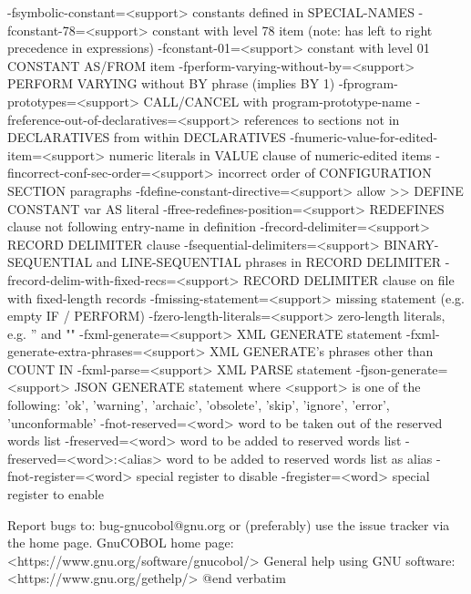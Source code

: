   -fsymbolic-constant=<support>	constants defined in SPECIAL-NAMES
  -fconstant-78=<support>	constant with level 78 item (note: has left to right precedence in expressions)
  -fconstant-01=<support>	constant with level 01 CONSTANT AS/FROM item
  -fperform-varying-without-by=<support>	PERFORM VARYING without BY phrase (implies BY 1)
  -fprogram-prototypes=<support>	CALL/CANCEL with program-prototype-name
  -freference-out-of-declaratives=<support>	references to sections not in DECLARATIVES from within DECLARATIVES
  -fnumeric-value-for-edited-item=<support>	numeric literals in VALUE clause of numeric-edited items
  -fincorrect-conf-sec-order=<support>	incorrect order of CONFIGURATION SECTION paragraphs
  -fdefine-constant-directive=<support>	allow >> DEFINE CONSTANT var AS literal
  -ffree-redefines-position=<support>	REDEFINES clause not following entry-name in definition
  -frecord-delimiter=<support>	RECORD DELIMITER clause
  -fsequential-delimiters=<support>	BINARY-SEQUENTIAL and LINE-SEQUENTIAL phrases in RECORD DELIMITER
  -frecord-delim-with-fixed-recs=<support>	RECORD DELIMITER clause on file with fixed-length records
  -fmissing-statement=<support>	missing statement (e.g. empty IF / PERFORM)
  -fzero-length-literals=<support>	zero-length literals, e.g. '' and ""
  -fxml-generate=<support>	XML GENERATE statement
  -fxml-generate-extra-phrases=<support>	XML GENERATE's phrases other than COUNT IN
  -fxml-parse=<support>	XML PARSE statement  
  -fjson-generate=<support>	JSON GENERATE statement
	where <support> is one of the following:
	'ok', 'warning', 'archaic', 'obsolete', 'skip', 'ignore', 'error', 'unconformable'
  -fnot-reserved=<word>  word to be taken out of the reserved words list
  -freserved=<word>      word to be added to reserved words list
  -freserved=<word>:<alias>	word to be added to reserved words list as alias
  -fnot-register=<word>  special register to disable
  -fregister=<word>      special register to enable


Report bugs to: bug-gnucobol@gnu.org
or (preferably) use the issue tracker via the home page.
GnuCOBOL home page: <https://www.gnu.org/software/gnucobol/>
General help using GNU software: <https://www.gnu.org/gethelp/>
@end verbatim
